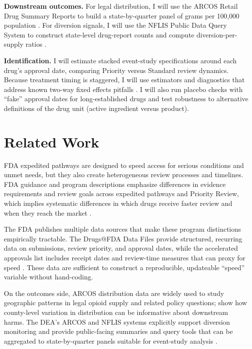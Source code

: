 \documentclass[11pt]{article}
\begin{document}
\textbf{Downstream outcomes.} For legal distribution, I will use the ARCOS Retail Drug Summary Reports to build a state-by-quarter panel of grams per 100,000 population \parencite{DEAARCOSRetailDrugSummary}. %
For diversion signals, I will use the NFLIS Public Data Query System to construct state-level drug-report counts and compute diversion-per-supply ratios \parencite{DEANFLISPublicDQSOverview,DEA2022NFLISDQSQuickReference}. %

\textbf{Identification.} I will estimate stacked event-study specifications around each drug's approval date, comparing Priority versus Standard review dynamics. Because treatment timing is staggered, I will use estimators and diagnostics that address known two-way fixed effects pitfalls \parencite{GoodmanBacon2021DiDTiming}. I will also run placebo checks with ``fake'' approval dates for long-established drugs and test robustness to alternative definitions of the drug unit (active ingredient versus product).

\section*{Related Work}
FDA expedited pathways are designed to speed access for serious conditions and unmet needs, but they also create heterogeneous review processes and timelines. FDA guidance and program descriptions emphasize differences in evidence requirements and review goals across expedited pathways and Priority Review, which implies systematic differences in which drugs receive faster review and when they reach the market \parencite{FDA2014ExpeditedProgramsGuidance,FDA2023ExpeditedProgramsOverview,FDA2018PriorityReview}.

The FDA publishes multiple data sources that make these program distinctions empirically tractable. The Drugs@FDA Data Files provide structured, recurring data on submissions, review priority, and approval dates, while the accelerated approvals list includes receipt dates and review-time measures that can proxy for speed \parencite{FDA2026DrugsAtFDADataFiles,FDA2025AcceleratedApprovalsSurrogate}. These data are sufficient to construct a reproducible, updateable ``speed'' variable without hand-coding.

On the outcomes side, ARCOS distribution data are widely used to study geographic patterns in legal opioid supply and related policy questions; \textcite{Griffith2021CountyOpioidDistribution} show how county-level variation in distribution can be informative about downstream harms. The DEA's ARCOS and NFLIS systems explicitly support diversion monitoring and provide public-facing summaries and query tools that can be aggregated to state-by-quarter panels suitable for event-study analysis \parencite{DEAARCOS,DEAARCOSRetailDrugSummary,DEANFLISOverview}. %
\end{document}
